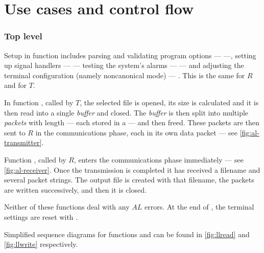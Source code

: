 \documentclass[main.tex]{subfiles}
\begin{document}
\section{Use cases and control flow}
\label{sec:usecases}

\subsubsection{Top level}

Setup in function  includes parsing and validating program options ---  ---, setting up signal handlers ---  --- testing the system's alarms ---  --- and adjusting the terminal configuration (namely noncanonical mode) --- .
This is the same for $R$ and for $T$.

In function , called by $T$, the selected file is opened, its size is calculated and it is then read into a single \emph{buffer} and closed.
The \emph{buffer} is then split into multiple \emph{packets} with length  --- each stored in a  --- and then freed.
These packets are then sent to $R$ in the communications phase, each in its own data packet --- see \autoref{fig:al-transmitter}.

Function , called by $R$, enters the communications phase immediately --- see \autoref{fig:al-receiver}.
Once the transmission is completed it has received a filename and several packet strings.
The output file is created with that filename, the packets are written successively, and then it is closed.

Neither of these functions deal with any $AL$ errors.
At the end of , the terminal settings are reset with .

Simplified sequence diagrams for functions  and  can be found in \autoref{fig:llread} and \autoref{fig:llwrite} respectively.
\end{document}
